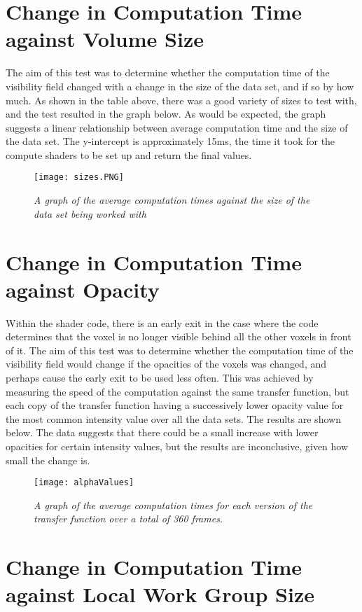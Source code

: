 \section{Change in Computation Time against Volume Size}

The aim of this test was to determine whether the computation time of the visibility field changed with a change in the size of the data set, and if so by how much. As shown in the table above, there was a good variety of sizes to test with, and the test resulted in the graph below. As would be expected, the graph suggests a linear relationship between average computation time and the size of the data set. The y-intercept is approximately 15ms, the time it took for the compute shaders to be set up and return the final values.

\begin{figure}[H]
\centering
\texttt{[image: sizes.PNG]} 
\caption{\textit{A graph of the average computation times against the size of the data set being worked with}}
\end{figure}

\section{Change in Computation Time against Opacity}

Within the shader code, there is an early exit in the case where the code determines that the voxel is no longer visible behind all the other voxels in front of it. The aim of this test was to determine whether the computation time of the visibility field would change if the opacities of the voxels was changed, and perhaps cause the early exit to be used less often. This was achieved by measuring the speed of the computation against the same transfer function, but each copy of the transfer function having a successively lower opacity value for the most common intensity value over all the data sets. The results are shown below. The data suggests that there could be a small increase with lower opacities for certain intensity values, but the results are inconclusive, given how small the change is.

\begin{figure}[H]
\centering
\texttt{[image: alphaValues]} 
\caption{\textit{A graph of the average computation times for each version of the transfer function over a total of 360 frames.}}
\end{figure}

\section{Change in Computation Time against Local Work Group Size}


